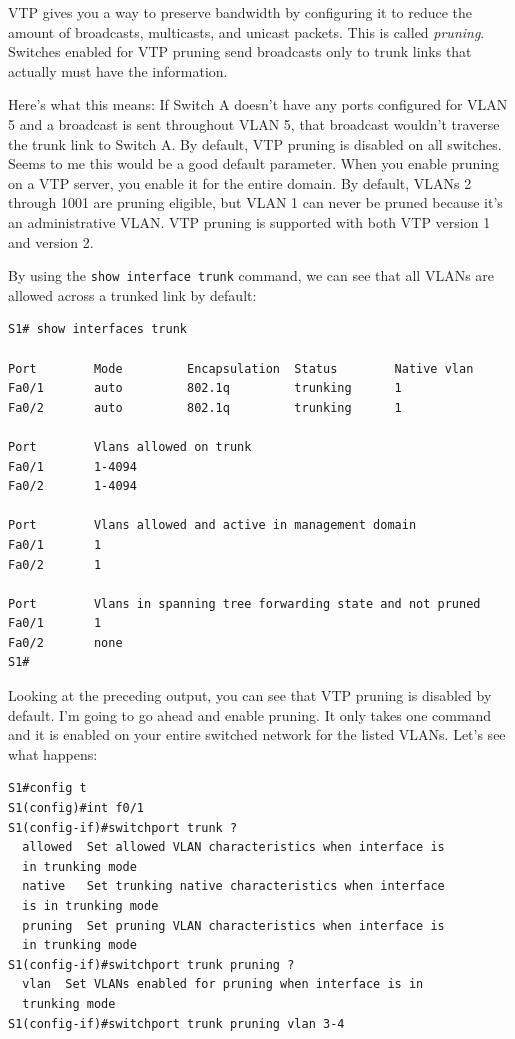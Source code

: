 VTP gives you a way to preserve bandwidth by configuring it to reduce
the amount of broadcasts, multicasts, and unicast packets. This is
called \emph{pruning}. Switches enabled for VTP pruning send broadcasts
only to trunk links that actually must have the information.

Here's what this means: If Switch A doesn't have any ports configured
for VLAN 5 and a broadcast is sent throughout VLAN 5, that broadcast
wouldn't traverse the trunk link to Switch A. By default, VTP pruning is
disabled on all switches. Seems to me this would be a good default
parameter. When you enable pruning on a VTP server, you enable it for
the entire domain. By default, VLANs 2 through 1001 are pruning
eligible, but VLAN 1 can never be pruned because it's an administrative
VLAN. VTP pruning is supported with both VTP version 1 and version 2.

By using the \texttt{show\ interface\ trunk} command, we can see that
all VLANs are allowed across a trunked link by default:

\begin{verbatim}
S1# show interfaces trunk

Port        Mode         Encapsulation  Status        Native vlan
Fa0/1       auto         802.1q         trunking      1
Fa0/2       auto         802.1q         trunking      1

Port        Vlans allowed on trunk
Fa0/1       1-4094
Fa0/2       1-4094

Port        Vlans allowed and active in management domain
Fa0/1       1
Fa0/2       1

Port        Vlans in spanning tree forwarding state and not pruned
Fa0/1       1
Fa0/2       none
S1#
\end{verbatim}

Looking at the preceding output, you can see that VTP pruning is
disabled by default. I'm going to go ahead and enable pruning. It only
takes one command and it is enabled on your entire switched network for
the listed VLANs. Let's see what happens:

\begin{verbatim}
S1#config t
S1(config)#int f0/1
S1(config-if)#switchport trunk ?
  allowed  Set allowed VLAN characteristics when interface is
  in trunking mode
  native   Set trunking native characteristics when interface
  is in trunking mode
  pruning  Set pruning VLAN characteristics when interface is
  in trunking mode
S1(config-if)#switchport trunk pruning ?
  vlan  Set VLANs enabled for pruning when interface is in
  trunking mode
S1(config-if)#switchport trunk pruning vlan 3-4
\end{verbatim}


